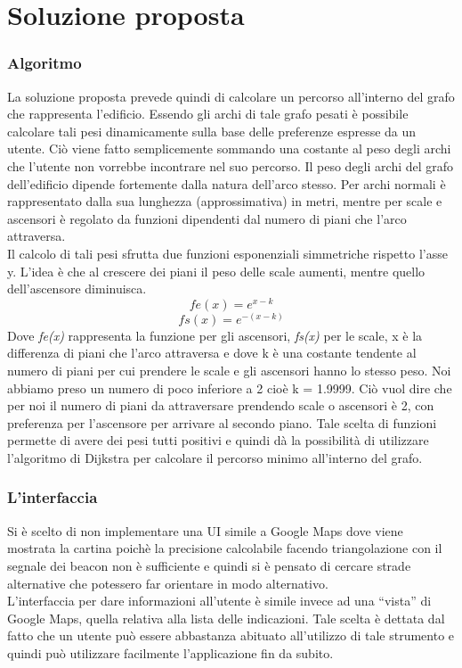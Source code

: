 \documentclass[../DocumentazioneDelloStudio.tex]{subfiles}
\begin{document}
\section{Soluzione proposta}
	\subsubsection{Algoritmo}
		La soluzione proposta prevede quindi di calcolare un percorso all'interno del grafo che rappresenta l'edificio. Essendo gli archi di tale grafo pesati è possibile calcolare tali pesi dinamicamente sulla base delle preferenze espresse da un utente. Ciò viene fatto semplicemente sommando una costante al peso degli archi che l'utente non vorrebbe incontrare nel suo percorso. Il peso degli archi del grafo dell'edificio dipende fortemente dalla natura dell'arco stesso. Per archi normali è rappresentato dalla sua lunghezza (approssimativa) in metri, mentre per scale e ascensori è regolato da funzioni dipendenti dal numero di piani che l'arco attraversa.\\
		Il calcolo di tali pesi sfrutta due funzioni esponenziali simmetriche rispetto l'asse y. L'idea è che al crescere dei piani il peso delle scale aumenti, mentre quello dell'ascensore diminuisca. \\
		\[
			fe(x) = e^{x-k}
		\]
		\[
			fs(x) = e^{-(x-k)}
		\]
		Dove \textit{fe(x)} rappresenta la funzione per gli ascensori, \textit{fs(x)} per le scale, x è la differenza di piani che l'arco attraversa e dove k è una costante tendente al numero di piani per cui prendere le scale e gli ascensori hanno lo stesso peso. 
		Noi abbiamo preso un numero di poco inferiore a 2 cioè k = 1.9999. Ciò vuol dire che per noi il numero di piani da attraversare prendendo scale o ascensori è 2, con preferenza per l'ascensore per arrivare al secondo piano.
		Tale scelta di funzioni permette di avere dei pesi tutti positivi e quindi dà la possibilità di utilizzare l'algoritmo di Dijkstra per calcolare il percorso minimo all'interno del grafo.
	\subsubsection{L'interfaccia}
		Si è scelto di non implementare una UI simile a Google Maps dove viene mostrata la cartina poichè la precisione calcolabile facendo triangolazione con il segnale dei beacon non è sufficiente e quindi si è pensato di cercare strade alternative che potessero far orientare in modo alternativo. \\
		L'interfaccia per dare informazioni all'utente è simile invece ad una ``vista'' di Google Maps, quella relativa alla lista delle indicazioni. Tale scelta è dettata dal fatto che un utente può essere abbastanza abituato all'utilizzo di tale strumento e quindi può utilizzare facilmente l'applicazione fin da subito. 
\end{document}
